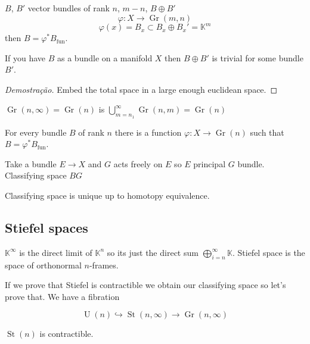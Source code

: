 \begin{claim}
	$B$, $B'$ vector bundles of rank $n$, $m-n$, $B\oplus B'$
	\[\varphi:X\to \operatorname{Gr}(m,n)\]
	\[\varphi (x)=B_x\subset B_x\oplus B_x'=\mathbb{K}^m\]
	then $B=\varphi^* B_{\operatorname{fun}}$.
\end{claim}

\begin{thm}\leavevmode
	If you have $B$ as a bundle on a manifold $X$ then $B\oplus B'$ is trivial for some bundle $B'$.
\end{thm}

\begin{proof}[Demostra\c c\~ao]
	Embed the total space in a large enough euclidean space.
\end{proof}

\begin{defn}
	$\operatorname{Gr}(n,\infty)=\operatorname{Gr}(n)$ is $\bigcup_{m=n_1}^\infty\operatorname{Gr}(n,m)=\operatorname{Gr}(n) $
\end{defn}

\begin{coro}
	For every bundle  $B$ of rank $n$ there is a function $\varphi:X\to \operatorname{Gr}(n)$ such that $B=\varphi^*B_{\operatorname{fun}}$.
\end{coro}

Take a bundle $E\to X$ and $G$ acts freely on $E$ so $E$ principal $G$ bundle. Classifying space  $BG$

\begin{thm}\leavevmode
	Classifying space is unique up to homotopy equivalence.
\end{thm}

\subsection{Stiefel spaces}

\begin{defn}
	$\mathbb{K}^\infty$ is the direct limit of $\mathbb{K}^n$ so its just the direct sum $\bigoplus_{i=n}^\infty\mathbb{K} $. Stiefel space is the space of orthonormal $n$-frames.
\end{defn}

If we prove that Stiefel is contractible we obtain our classifying space so let's prove that. We have a fibration

\[\operatorname{U}(n)\hookrightarrow \operatorname{St}(n,\infty)\to \operatorname{Gr}(n,\infty)\]

\begin{thm}
	$\operatorname{St}(n)$ is contractible.
\end{thm}

